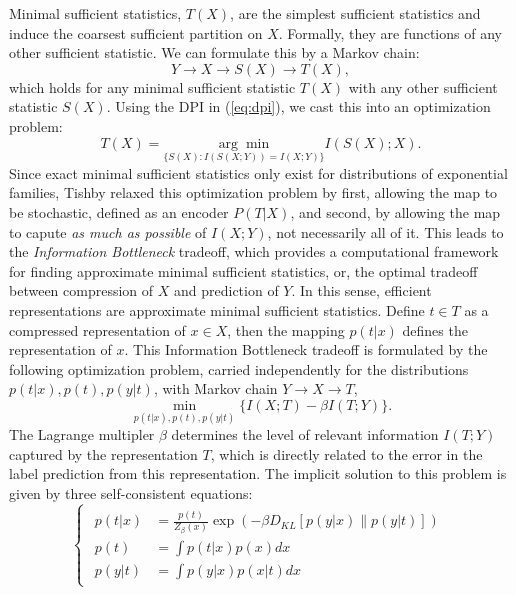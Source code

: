 \documentclass[11pt]{article}
\begin{document}
Minimal sufficient statistics, $T(X)$, are the simplest sufficient statistics and induce the coarsest sufficient partition on $X$. Formally, they are functions of any other sufficient statistic. We can formulate this by a Markov chain:
\begin{equation}
Y\rightarrow X\rightarrow S(X) \rightarrow T(X),
\end{equation}
which holds for any minimal sufficient statistic $T(X)$ with any other sufficient statistic $S(X)$. Using the DPI in (\ref{eq:dpi}), we cast this into an optimization problem:
\begin{equation}
T(X) = \underset{\{S(X):I(S(X;Y))=I(X;Y)\}}{\arg\min} I(S(X); X).
\end{equation}
Since exact minimal sufficient statistics only exist for distributions of exponential families, Tishby relaxed this optimization problem by first, allowing the map to be stochastic, defined as an encoder $P(T\vert X)$, and second, by allowing the map to capute \textit{as much as possible} of $I(X;Y)$, not necessarily all of it.
This leads to the \textit{Information Bottleneck} tradeoff, which provides a computational framework for finding approximate minimal sufficient statistics, or, the optimal tradeoff between compression of $X$ and prediction of $Y$. In this sense, efficient representations are approximate minimal sufficient statistics.
Define $t\in T$ as a compressed representation of $x\in X$, then the mapping $p(t\vert x)$ defines the representation of $x$. This Information Bottleneck tradeoff is formulated by the following optimization problem, carried independently for the distributions $p(t\vert x), p(t), p(y\vert t)$, with Markov chain $Y\rightarrow X \rightarrow T$,
\begin{equation}
\underset{p(t\vert x), p(t), p(y\vert t)}{\min} \{ I(X;T)-\beta I(T;Y) \}.
\end{equation}
The Lagrange multipler $\beta$ determines the level of relevant information $I(T;Y)$ captured by the representation $T$, which is directly related to the error in the label prediction from this representation. The implicit solution to this problem is given by three self-consistent equations:
\begin{equation}
\begin{cases}
\begin{array}{rl}
p(t\vert x) & =\frac{p(t)}{Z_{\beta}(x)}\exp\left(-\beta D_{KL}\left[p(y\vert x)\rVert p(y\vert t)\right]\right)\\
p(t) & =\int p(t\vert x)p(x)dx\\
p(y\vert t) & =\int p(y\vert x)p(x\vert t)dx
\end{array}
\end{cases}
\end{equation}
\end{document}
